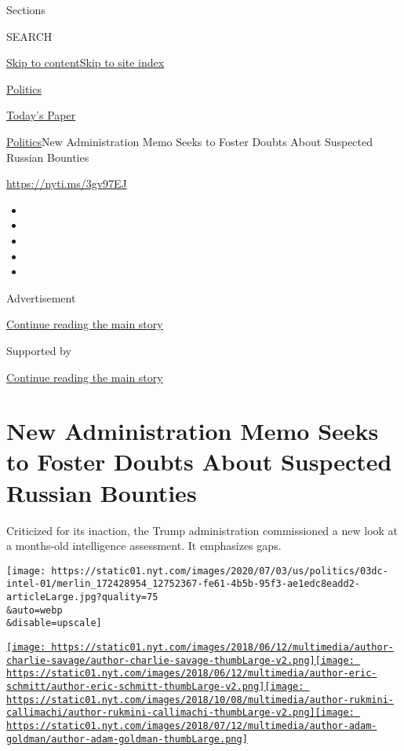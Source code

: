 Sections

SEARCH

\protect\hyperlink{site-content}{Skip to
content}\protect\hyperlink{site-index}{Skip to site index}

\href{https://www.nytimes.com/section/politics}{Politics}

\href{https://myaccount.nytimes.com/auth/login?response_type=cookie\&client_id=vi}{}

\href{https://www.nytimes.com/section/todayspaper}{Today's Paper}

\href{/section/politics}{Politics}\textbar{}New Administration Memo
Seeks to Foster Doubts About Suspected Russian Bounties

\url{https://nyti.ms/3gv97EJ}

\begin{itemize}
\item
\item
\item
\item
\item
\end{itemize}

Advertisement

\protect\hyperlink{after-top}{Continue reading the main story}

Supported by

\protect\hyperlink{after-sponsor}{Continue reading the main story}

\hypertarget{new-administration-memo-seeks-to-foster-doubts-about-suspected-russian-bounties}{%
\section{New Administration Memo Seeks to Foster Doubts About Suspected
Russian
Bounties}\label{new-administration-memo-seeks-to-foster-doubts-about-suspected-russian-bounties}}

Criticized for its inaction, the Trump administration commissioned a new
look at a months-old intelligence assessment. It emphasizes gaps.

\texttt{[image: https://static01.nyt.com/images/2020/07/03/us/politics/03dc-intel-01/merlin\_172428954\_12752367-fe61-4b5b-95f3-ae1edc8eadd2-articleLarge.jpg?quality=75\\\&auto=webp\\\&disable=upscale]}

\href{https://www.nytimes.com/by/charlie-savage}{\texttt{[image: https://static01.nyt.com/images/2018/06/12/multimedia/author-charlie-savage/author-charlie-savage-thumbLarge-v2.png]}}\href{https://www.nytimes.com/by/eric-schmitt}{\texttt{[image: https://static01.nyt.com/images/2018/06/12/multimedia/author-eric-schmitt/author-eric-schmitt-thumbLarge-v2.png]}}\href{https://www.nytimes.com/by/rukmini-callimachi}{\texttt{[image: https://static01.nyt.com/images/2018/10/08/multimedia/author-rukmini-callimachi/author-rukmini-callimachi-thumbLarge-v2.png]}}\href{https://www.nytimes.com/by/adam-goldman}{\texttt{[image: https://static01.nyt.com/images/2018/07/12/multimedia/author-adam-goldman/author-adam-goldman-thumbLarge.png]}}

